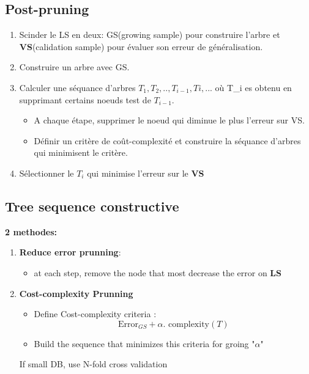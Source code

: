 \subsection{Post-pruning}

\begin{enumerate}
    \item Scinder le LS en deux: GS(growing sample) pour construire l'arbre et \textbf{VS}(calidation sample) 
    pour évaluer son erreur de généralisation. 
    \item Construire un arbre avec GS.
    \item Calculer une séquance d'arbres ${T_1,T_2,..,T_{i-1},T{i},...}$ où T\_i es obtenu en supprimant certains noeuds test de $T_{i-1}$.
    \begin{itemize}
        \item A chaque étape, supprimer le noeud qui diminue le plus l'erreur sur VS.
        \item Définir un critère de coût-complexité et construire la séquance d'arbres qui minimisent le critère.
    \end{itemize}
    \item Sélectionner le $T_i$ qui minimise l'erreur sur le \textbf{VS}
\end{enumerate}
\subsection{Tree sequence constructive}
\textbf{2 methodes:}
\begin{enumerate}
    \item \textbf{Reduce error prunning}: \begin{itemize}
        \item at each step, remove the node that most decrease the error on \textbf{LS}
    \end{itemize}
    \item \textbf{Cost-complexity Prunning}
    \begin{itemize}
        \item Define Cost-complexity criteria : $$\textrm{Error}_{GS} + \alpha.\textrm{ complexity}(T)$$
        \item Build the sequence that minimizes this criteria for groing "$\alpha$"
    \end{itemize}
    \textcolor{ao}{ If small DB, use N-fold cross validation}
\end{enumerate}
